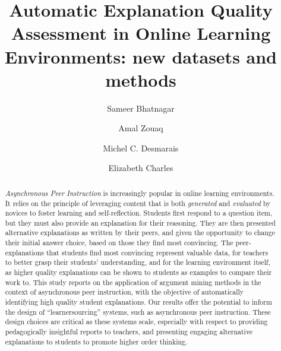 \documentclass[runningheads]{llncs}
\begin{document}
%
\title{Automatic Explanation Quality Assessment in Online Learning 
Environments: new datasets and methods}
%
\author{Sameer Bhatnagar \and
Amal Zouaq \and
Michel C. Desmarais \and
Elizabeth Charles
}
%

%
\maketitle              %
%
\begin{abstract}
\textit{Asynchronous Peer Instruction} is increasingly popular in 
online learning environments. It relies on the principle of 
leveraging content that is both \textit{generated} and \textit{evaluated} by 
novices to foster learning and self-reflection. 
Students first respond to a question item, but 
they must also provide an explanation for their reasoning. 
They are then presented alternative explanations as written by their peers, and 
given the opportunity to change their initial answer choice, based on those 
they find most convincing. 
The peer-explanations that students find most convincing represent valuable 
data, for teachers to better grasp their students' understanding, and for the 
learning environment itself, as higher quality explanations can be shown to 
students as examples to compare their work to. 
This study reports on the application of argument mining methods in the 
context of asynchronous peer instruction, with the objective of automatically 
identifying high quality student explanations. 
Our results offer the potential to inform the design of ``learnersourcing'' 
systems, such as asynchronous peer instruction.
These design choices are critical as these systems scale, especially with 
respect to providing pedagogically insightful reports to teachers, and 
presenting engaging alternative explanations to students to promote higher 
order thinking. 

\end{abstract}

\end{document}

